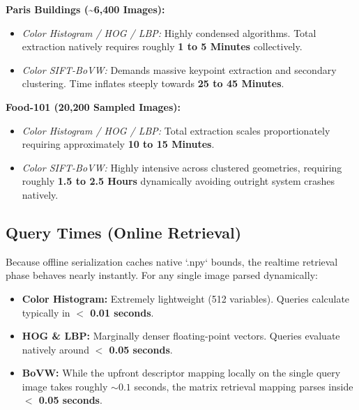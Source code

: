 \documentclass[11pt, a4paper]{article}
\begin{document}
\textbf{Paris Buildings (\textasciitilde 6,400 Images):}
\begin{itemize}
    \item \textit{Color Histogram / HOG / LBP:} Highly condensed algorithms. Total extraction natively requires roughly \textbf{1 to 5 Minutes} collectively.
    \item \textit{Color SIFT-BoVW:} Demands massive keypoint extraction and secondary clustering. Time inflates steeply towards \textbf{25 to 45 Minutes}.
\end{itemize}

\textbf{Food-101 (20,200 Sampled Images):}
\begin{itemize}
    \item \textit{Color Histogram / HOG / LBP:} Total extraction scales proportionately requiring approximately \textbf{10 to 15 Minutes}.
    \item \textit{Color SIFT-BoVW:} Highly intensive across clustered geometries, requiring roughly \textbf{1.5 to 2.5 Hours} dynamically avoiding outright system crashes natively.
\end{itemize}

\subsection{Query Times (Online Retrieval)}
Because offline serialization caches native `.npy` bounds, the realtime retrieval phase behaves nearly instantly. For any single image parsed dynamically:
\begin{itemize}
    \item \textbf{Color Histogram:} Extremely lightweight (512 variables). Queries calculate typically in \textbf{$<$ 0.01 seconds}.
    \item \textbf{HOG \& LBP:} Marginally denser floating-point vectors. Queries evaluate natively around \textbf{$<$ 0.05 seconds}.
    \item \textbf{BoVW:} While the upfront descriptor mapping locally on the single query image takes roughly $\sim 0.1$ seconds, the matrix retrieval mapping parses inside \textbf{$<$ 0.05 seconds}.
\end{itemize}
\end{document}

